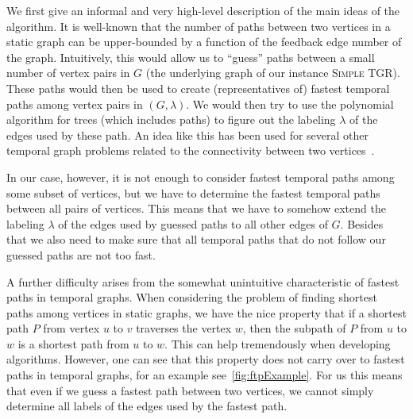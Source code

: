 \documentclass[a4paper,UKenglish,cleveref, autoref, thm-restate,anonymous]{lipics-v2021}
\newcommand{\ie}{i.\,e.,\ }
\newcommand{\deltaExact}{\textsc{Simple TGR}}
\begin{document}
We first give an informal and very high-level description of the main ideas of the algorithm. It is well-known that the number of paths between two vertices in a static graph can be upper-bounded by a function of the feedback edge number of the graph. Intuitively, this would allow us to ``guess'' paths between a small number of vertex pairs in $G$ (the underlying graph of our instance \deltaExact). These paths would then be used to create (representatives of) fastest temporal paths among vertex pairs in $(G,\lambda)$. We would then try to use the polynomial algorithm for trees (which includes paths) to figure out the labeling $\lambda$ of the edges used by these path. An idea like this has been used for several other temporal graph problems related to the connectivity between two vertices~\cite{casteigts2021finding,FMNR22a,EMM22}.

In our case, however, it is not enough to consider fastest temporal paths among some subset of vertices, but we have to determine the fastest temporal paths between all pairs of vertices. This means that we have to somehow extend the labeling $\lambda$ of the edges used by guessed paths to all other edges of $G$.
Besides that we also need to make sure that all temporal paths that do not follow our guessed paths are not too fast. 

	A further difficulty arises from the somewhat unintuitive characteristic of fastest paths in temporal graphs.
 When considering the problem of finding shortest paths among vertices in static graphs, we have the nice property that if a shortest path $P$ from vertex $u$ to $v$ traverses the vertex $w$,
	then the subpath of $P$ from $u$ to $w$ is a shortest path from $u$ to $w$. This can help tremendously when developing algorithms.
	However, one can see that this property does not carry over to fastest paths in temporal graphs, for an example see~\cref{fig:ftpExample}.
 For us this means that even if we guess a fastest path between two vertices, we cannot simply determine all labels of the edges used by the fastest path.
	
\end{document}
